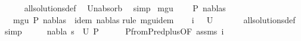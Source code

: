 \begin{isabellebody}
\ \ \ \ \isamarkupfalse%
\ all{\isacharunderscore}{\kern0pt}solutions{\isacharunderscore}{\kern0pt}def\ \isamarkupfalse%
\ Un{\isacharunderscore}{\kern0pt}absorb\ \isamarkupfalse%
\ simp\isanewline
{}\isamarkupfalse%
%
\endisatagproof
{\isafoldproof}%
%
\isadelimproof
\isanewline
%
\endisadelimproof
\isanewline
{}\isamarkupfalse%
\ mgu{\isacharcolon}{\kern0pt}\ \isanewline
\ \ \ {\isachardoublequoteopen}P\ {\isasymTurnstile}{\isacharparenleft}{\kern0pt}nabla{\isacharcomma}{\kern0pt}s{\isacharparenright}{\kern0pt}{\isasymRightarrow}{\isacharparenleft}{\kern0pt}{\isacharbrackleft}{\kern0pt}{\isacharbrackright}{\kern0pt}{\isacharcomma}{\kern0pt}{\isacharbrackleft}{\kern0pt}{\isacharbrackright}{\kern0pt}{\isacharparenright}{\kern0pt}{\isachardoublequoteclose}\isanewline
\ \ \ {\isachardoublequoteopen}mgu\ P\ {\isacharparenleft}{\kern0pt}nabla{\isacharcomma}{\kern0pt}s{\isacharparenright}{\kern0pt}\ {\isasymand}\ idem\ {\isacharparenleft}{\kern0pt}nabla{\isacharcomma}{\kern0pt}s{\isacharparenright}{\kern0pt}{\isachardoublequoteclose}\isanewline
%
\isadelimproof
%
\endisadelimproof
%
\isatagproof
{}\isamarkupfalse%
{\isacharparenleft}{\kern0pt}rule\ mgu{\isacharunderscore}{\kern0pt}idem{\isacharparenright}{\kern0pt}\isanewline
\ \ \isamarkupfalse%
\ i{\isacharcolon}{\kern0pt}\ {\isachardoublequoteopen}{\isacharparenleft}{\kern0pt}{\isacharbraceleft}{\kern0pt}{\isacharbraceright}{\kern0pt}{\isacharcomma}{\kern0pt}{\isacharbrackleft}{\kern0pt}{\isacharbrackright}{\kern0pt}{\isacharparenright}{\kern0pt}\ {\isasymin}\ U\ {\isacharparenleft}{\kern0pt}{\isacharbrackleft}{\kern0pt}{\isacharbrackright}{\kern0pt}{\isacharcomma}{\kern0pt}{\isacharbrackleft}{\kern0pt}{\isacharbrackright}{\kern0pt}{\isacharparenright}{\kern0pt}{\isachardoublequoteclose}\isanewline
\ \ \ \ \isamarkupfalse%
\ all{\isacharunderscore}{\kern0pt}solutions{\isacharunderscore}{\kern0pt}def\ \isamarkupfalse%
\ simp\isanewline
\ \ \isamarkupfalse%
\ \isamarkupfalse%
\ {\isachardoublequoteopen}{\isacharparenleft}{\kern0pt}nabla{\isacharcomma}{\kern0pt}\ s{\isacharparenright}{\kern0pt}\ {\isasymin}\ U\ P{\isachardoublequoteclose}\isanewline
\ \ \ \ \isamarkupfalse%
\ P{}{\isacharunderscore}{\kern0pt}from{\isacharunderscore}{\kern0pt}P{}{\isacharunderscore}{\kern0pt}red{\isacharunderscore}{\kern0pt}plus{\isacharbrackleft}{\kern0pt}OF\ assms\ i{\isacharbrackright}{\kern0pt}\ \isanewline

\end{isabellebody}
